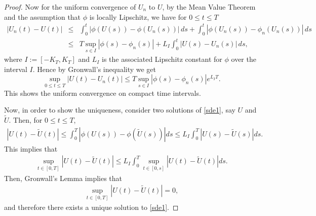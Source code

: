 \documentclass[12pt,reqno]{amsart}
\newcommand{\red}{\textcolor[rgb]{1.00,0.00,0.00}}
\theoremstyle{definition}
\theoremstyle{remark}
\begin{document}
\begin{proof}
Now for the uniform convergence of $U_n$ to $U$,
by the Mean Value Theorem and the assumption that $\phi$ is locally Lipschitz, we have for $0\le t\le T$
  \begin{eqnarray*}
    |U_n(t)-U(t)|&\le& \int_0^t|\phi(U(s))-\phi(U_n(s))|\,ds+\int_0^t|\phi(U_n(s))-\phi_n(U_n(s)) | \,ds\\
    &\le & T\sup_{s\in I}|\phi(s)-\phi_n(s)|+L_I\int_0^t|U(s)-U_n(s)|\,ds,
\end{eqnarray*}
where $I := [-K_T,K_T]$ and $L_I$ is the associated Lipschitz constant for $\phi$ over the interval $I$.
Hence by Gronwall's inequality we get $$\sup_{0\le t\le T}|U(t)-U_n(t)|\le T\sup_{s\in I}|\phi(s)-\phi_n(s)|e^{L_I  T}.$$ 
This shows the uniform convergence on compact time intervals.
\begin{comment}
  he uniform convergence of $\phi_n$ to $\phi$ and $U_n$ to $U$ on compact sets, together with the continuity of $\phi$, we obtain that  
  \begin{align*}
U(t) = \lim_{n \rightarrow \infty} U_n(t)=X(t) -  \lim_{n \rightarrow \infty}\int_0^t\phi_n(U_n(s))ds  = X(t) -  \int_0^t\phi(U(s))ds.\end{align*}
\end{comment}


Now, in order to show the uniqueness, consider two solutions of \eqref{sde1}, say $U$ and $\tilde{U}$. Then, for $0\le t\le T$,
\begin{align*}
|U(t)-\tilde{U}(t)|\leq \int_0^T|\phi(U(s))-\phi(\tilde{U}(s))|ds\leq L_I\int_0^T|U(s)-\tilde{U}(s)|ds.
\end{align*}
This implies that
\begin{align*}
\sup_{t\in[0,T]}|U(t)-\tilde{U}(t)|\leq L_I\int_0^T\sup_{t\in[0,s]}|U(t)-\tilde{U}(t)|ds.
\end{align*}
Then, Gronwall's Lemma implies that
\begin{align*}
\sup_{t\in[0,T]}|U(t)-\tilde{U}(t)|=0,
\end{align*}
and therefore there exists a unique solution to \eqref{sde1}.
\end{proof}




\end{document}
